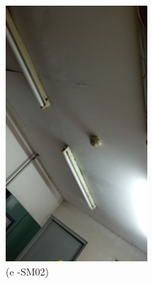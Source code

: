 \begin{figure}
\begin{minipage}[b]{0.2\linewidth}
		\includegraphics[width=\textwidth]{figures/fig_ch04_fdas_sm02}
	\caption*{(e -SM02)}
\end{minipage}
	\hspace{0.05cm}
\begin{minipage}[b]{0.2\linewidth}
	\centering

\end{minipage}
\end{figure}
